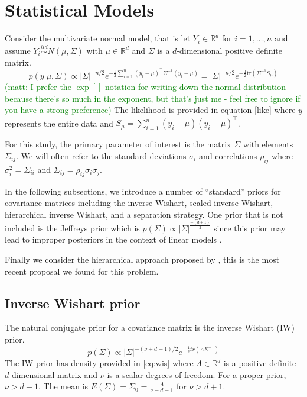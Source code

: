 \documentclass[a4paper]{article}
\newcommand{\matt}[1]{\textcolor{green}{(matt: #1)}}
\begin{document}
\section{Statistical Models}

Consider the multivariate normal model, that is let $Y_i\in \mathbb{R}^d$ for $i=1,\ldots,n$ and assume $Y_i \stackrel{iid}{\sim} N(\mu, \Sigma)$ with $\mu\in \mathbb{R}^d$ and $\Sigma$ is a $d$-dimensional positive definite matrix.   
  \begin{equation}
 p(y\vert \mu,\Sigma) \propto |\Sigma|^{-n/2} e^{- \frac{1}{2} \sum_{i=1}^n (y_i-\mu)^\top \Sigma^{-1} (y_i-\mu) } = |\Sigma|^{-n/2} e^{- \frac{1}{2}  \mbox{tr}(\Sigma^{-1}S_\mu)  } 
 \label{like}
 \end{equation} \matt{I prefer the $\exp[]$ notation for writing down the normal distribution because there's so much in the exponent, but that's just me - feel free to ignore if you have a strong preference}
The likelihood is provided in equation \eqref{like} where $y$ represents the entire data and  $S_\mu = \sum_{i=1}^n (y_i-\mu) (y_i-\mu) ^\top$. 


For this study, the primary parameter of interest is the matrix $\Sigma$ with elements $\Sigma_{ij}$. We will often refer to the standard deviations $\sigma_i$ and correlations $\rho_{ij}$ where $\sigma_i^2 = \Sigma_{ii}$ and $\Sigma_{ij} = \rho_{ij}\sigma_i\sigma_j$. 

In the following subsections, we introduce a number of ``standard'' priors for covariance matrices including the inverse Wishart, scaled inverse Wishart, hierarchical inverse Wishart, and a separation strategy. One prior that is not included is the Jeffreys prior which is $p(\Sigma)\propto |\Sigma| ^ {\frac{-(d+1)}{2} } $ since this prior may lead to improper posteriors in the context of linear models \citep{gelman2006prior, SIW2008}. 


 Finally we consider the hierarchical approach proposed by \cite{huang2013simple}, this is the most recent proposal we found for this problem. 

\subsection{Inverse Wishart prior}

The natural conjugate prior for a covariance matrix is the inverse Wishart (IW) prior\citep{barnard2000}. 
\begin{equation} 
p(\Sigma) \propto  |\Sigma|^{-(\nu+ d +1)/2 } e^{-\frac{1}{2} tr( \Lambda \Sigma^{-1}) }
\label{eq:wis}
\end{equation}
The IW prior has density provided in \eqref{eq:wis} where $\Lambda\in \mathbb{R}^d$ is a positive definite $d$ dimensional matrix and $\nu$ is a scalar degrees of freedom. For a proper prior, $\nu>d-1$. The mean is $E(\Sigma) = \Sigma_0= \frac{\Lambda}{\nu - d - 1}$ for $\nu>d+1$. 
\end{document}
